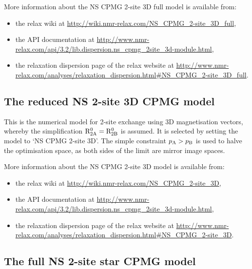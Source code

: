 More information about the NS CPMG 2-site 3D full model is available from:
\begin{itemize}
  \item the relax wiki at \url{http://wiki.nmr-relax.com/NS\_CPMG\_2-site\_3D\_full},
  \item the API documentation at \url{http://www.nmr-relax.com/api/3.2/lib.dispersion.ns\_cpmg\_2site\_3d-module.html},
  \item the relaxation dispersion page of the relax website at \url{http://www.nmr-relax.com/analyses/relaxation\_dispersion.html#NS\_CPMG\_2-site\_3D\_full}.
\end{itemize}



\subsection{The reduced NS 2-site 3D CPMG model}
\label{sect: dispersion: NS CPMG 2-site 3D model}

This is the numerical model for 2-site exchange using 3D magnetisation vectors, whereby the simplification $\mathrm{R}_{\mathrm{2A}}^0 = \mathrm{R}_{\mathrm{2B}}^0$ is assumed.
It is selected by setting the model to `NS CPMG 2-site 3D'.
The simple constraint $p_{\textrm{A}} > p_{\textrm{B}}$ is used to halve the optimisation space, as both sides of the limit are mirror image spaces.

More information about the NS CPMG 2-site 3D model is available from:
\begin{itemize}
  \item the relax wiki at \url{http://wiki.nmr-relax.com/NS\_CPMG\_2-site\_3D},
  \item the API documentation at \url{http://www.nmr-relax.com/api/3.2/lib.dispersion.ns\_cpmg\_2site\_3d-module.html},
  \item the relaxation dispersion page of the relax website at \url{http://www.nmr-relax.com/analyses/relaxation\_dispersion.html#NS\_CPMG\_2-site\_3D}.
\end{itemize}



\subsection{The full NS 2-site star CPMG model}
\label{sect: dispersion: NS CPMG 2-site star full model}

